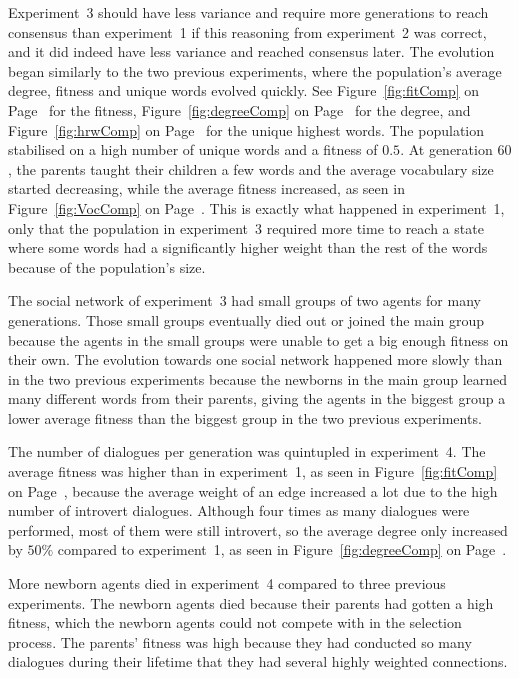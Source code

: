 Experiment~3 should have less variance and require more generations to reach consensus than experiment~1 if this reasoning from experiment~2 was correct, and it did indeed have less variance and reached consensus later. The evolution began similarly to the two previous experiments, where the population's average degree, fitness and unique words evolved quickly. See Figure~\ref{fig:fitComp} on Page~\pageref{fig:fitComp} for the fitness, Figure~\ref{fig:degreeComp} on Page~\pageref{fig:degreeComp} for the degree, and Figure~\ref{fig:hrwComp} on Page~\pageref{fig:hrwComp} for the unique highest words. The population stabilised on a high number of unique words and a fitness of $0.5$. At generation $60$, the parents taught their children a few words and the average vocabulary size started decreasing, while the average fitness increased, as seen in Figure~\ref{fig:VocComp} on Page~\pageref{fig:VocComp}. This is exactly what happened in experiment~1, only that the population in experiment~3 required more time to reach a state where some words had a significantly higher weight than the rest of the words because of the population’s size. 

The social network of experiment~3 had small groups of two agents for many generations. Those small groups eventually died out or joined the main group because the agents in the small groups were unable to get a big enough fitness on their own. The evolution towards one social network happened more slowly than in the two previous experiments because the newborns in the main group learned many different words from their parents, giving the agents in the biggest group a lower average fitness than the biggest group in the two previous experiments.

The number of dialogues per generation was quintupled in experiment~4. The average fitness was higher than in experiment~1, as seen in Figure~\ref{fig:fitComp} on Page~\pageref{fig:fitComp}, because the average weight of an edge increased a lot due to the high number of introvert dialogues. Although four times as many dialogues were performed, most of them were still introvert, so the average degree only increased by $50\%$ compared to experiment~1, as seen in Figure~\ref{fig:degreeComp} on Page~\pageref{fig:degreeComp}.

More newborn agents died in experiment~4 compared to three previous experiments. The newborn agents died because their parents had gotten a high fitness, which the newborn agents could not compete with in the selection process. The parents' fitness was high because they had conducted so many dialogues during their lifetime that they had several highly weighted connections. 

